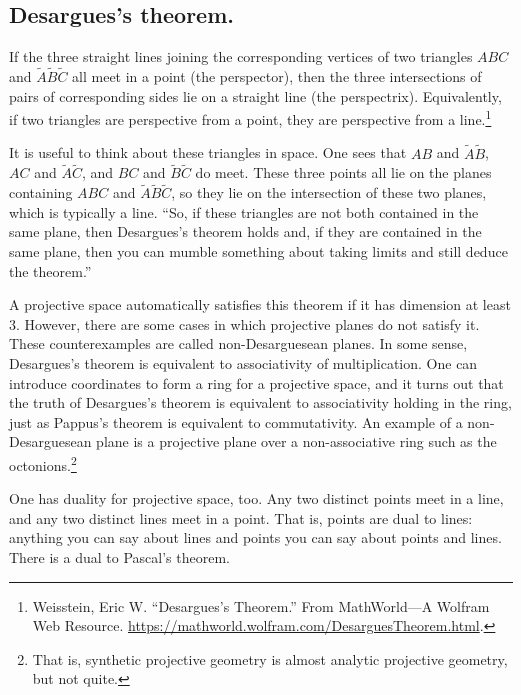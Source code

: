 \documentclass [11 pt, oneside] {article}
\begin{document}
\subsection{Desargues's theorem.}
\begin{theorem}[Desargues]\label{}
If the three straight lines joining the corresponding vertices of two triangles $ABC$ and $\tilde A\tilde B\tilde C$ all meet in a point (the perspector), then the three intersections of pairs of corresponding sides lie on a straight line (the perspectrix). Equivalently, if two triangles are perspective from a point, they are perspective from a line.\footnote{Weisstein, Eric W. ``Desargues's Theorem.'' From {MathWorld}---A Wolfram Web Resource. \url{https://mathworld.wolfram.com/DesarguesTheorem.html}.}
\end{theorem}

It is useful to think about these triangles in space. One sees that $AB$ and $\tilde A\tilde B$, $AC$ and $\tilde A\tilde C$, and $BC$ and $\tilde B\tilde C$ do meet. These three points all lie on the planes containing $ABC$ and $\tilde A\tilde B\tilde C$, so they lie on the intersection of these two planes, which is typically a line. ``So, if these triangles are not both contained in the same plane, then Desargues's theorem holds and, if they are contained in the same plane, then you can mumble something about taking limits and still deduce the theorem.''

A projective space automatically satisfies this theorem if it has dimension at least $3$. However, there are some cases in which projective planes do not satisfy it. These counterexamples are called non-Desarguesean planes. In some sense, Desargues's theorem is equivalent to associativity of multiplication. One can introduce coordinates to form a ring for a projective space, and it turns out that the truth of Desargues's theorem is equivalent to associativity holding in the ring, just as Pappus's theorem is equivalent to commutativity. An example of a non-Desarguesean plane is a projective plane over a non-associative ring such as the octonions.\footnote{That is, synthetic projective geometry is almost analytic projective geometry, but not quite.}

One has duality for projective space, too. Any two distinct points meet in a line, and any two distinct lines meet in a point. That is, points are dual to lines: anything you can say about lines and points you can say about points and lines. There is a dual to Pascal's theorem. 
\end{document}
